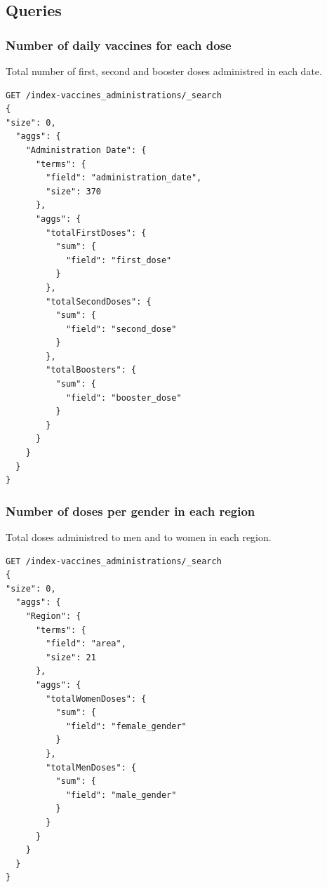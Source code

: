 \documentclass[12pt, a4paper]{article}
\begin{document}
\subsection{Queries}

\subsubsection{Number of daily vaccines for each dose}
Total number of first, second and booster doses administred in each date.
\begin{tcolorbox}[fontupper=\scriptsize]
  \begin{verbatim}
GET /index-vaccines_administrations/_search
{
"size": 0, 
  "aggs": {
    "Administration Date": {
      "terms": {
        "field": "administration_date",
        "size": 370
      },
      "aggs": {
        "totalFirstDoses": {
          "sum": {
            "field": "first_dose"
          }
        },        
        "totalSecondDoses": {
          "sum": {
            "field": "second_dose"
          }
        },        
        "totalBoosters": {
          "sum": {
            "field": "booster_dose"
          }
        }
      }
    }
  } 
}
  \end{verbatim}
\end{tcolorbox}

\subsubsection{Number of doses per gender in each region}
Total doses administred to men and to women in each region. 
\begin{tcolorbox}[fontupper=\scriptsize]
  \begin{verbatim}
GET /index-vaccines_administrations/_search
{
"size": 0, 
  "aggs": {
    "Region": {
      "terms": {
        "field": "area",
        "size": 21
      },
      "aggs": {
        "totalWomenDoses": {
          "sum": {
            "field": "female_gender"
          }
        },        
        "totalMenDoses": {
          "sum": {
            "field": "male_gender"
          }
        }
      }
    }
  } 
}
  \end{verbatim}
\end{tcolorbox}
\end{document}
